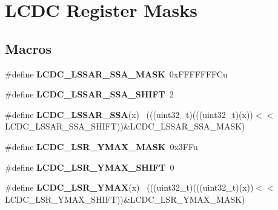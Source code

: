 \hypertarget{group___l_c_d_c___register___masks}{}\section{L\+C\+D\+C Register Masks}
\label{group___l_c_d_c___register___masks}
\subsection*{Macros}
\begin{DoxyCompactItemize}
\item 
\hypertarget{group___l_c_d_c___register___masks_ga2bc109f6b41c11d1b0abfa8b487698ef}{}\#define {\bfseries L\+C\+D\+C\+\_\+\+L\+S\+S\+A\+R\+\_\+\+S\+S\+A\+\_\+\+M\+A\+S\+K}~0x\+F\+F\+F\+F\+F\+F\+F\+Cu\label{group___l_c_d_c___register___masks_ga2bc109f6b41c11d1b0abfa8b487698ef}

\item 
\hypertarget{group___l_c_d_c___register___masks_gad13163c04bf9e7420934dd08e0f37ae0}{}\#define {\bfseries L\+C\+D\+C\+\_\+\+L\+S\+S\+A\+R\+\_\+\+S\+S\+A\+\_\+\+S\+H\+I\+F\+T}~2\label{group___l_c_d_c___register___masks_gad13163c04bf9e7420934dd08e0f37ae0}

\item 
\hypertarget{group___l_c_d_c___register___masks_gaf19ad0434e636ba362fe9377cf2ef88d}{}\#define {\bfseries L\+C\+D\+C\+\_\+\+L\+S\+S\+A\+R\+\_\+\+S\+S\+A}(x)                                            ~(((uint32\+\_\+t)(((uint32\+\_\+t)(x))$<$$<$L\+C\+D\+C\+\_\+\+L\+S\+S\+A\+R\+\_\+\+S\+S\+A\+\_\+\+S\+H\+I\+F\+T))\&L\+C\+D\+C\+\_\+\+L\+S\+S\+A\+R\+\_\+\+S\+S\+A\+\_\+\+M\+A\+S\+K)\label{group___l_c_d_c___register___masks_gaf19ad0434e636ba362fe9377cf2ef88d}

\item 
\hypertarget{group___l_c_d_c___register___masks_ga4ae2fd9ab849237983b3aa226576cfac}{}\#define {\bfseries L\+C\+D\+C\+\_\+\+L\+S\+R\+\_\+\+Y\+M\+A\+X\+\_\+\+M\+A\+S\+K}~0x3\+F\+Fu\label{group___l_c_d_c___register___masks_ga4ae2fd9ab849237983b3aa226576cfac}

\item 
\hypertarget{group___l_c_d_c___register___masks_ga25b78dbb133c75414d19304f7f549ac3}{}\#define {\bfseries L\+C\+D\+C\+\_\+\+L\+S\+R\+\_\+\+Y\+M\+A\+X\+\_\+\+S\+H\+I\+F\+T}~0\label{group___l_c_d_c___register___masks_ga25b78dbb133c75414d19304f7f549ac3}

\item 
\hypertarget{group___l_c_d_c___register___masks_gaf21cfefcf576b4491de721a015aadf63}{}\#define {\bfseries L\+C\+D\+C\+\_\+\+L\+S\+R\+\_\+\+Y\+M\+A\+X}(x)                                              ~(((uint32\+\_\+t)(((uint32\+\_\+t)(x))$<$$<$L\+C\+D\+C\+\_\+\+L\+S\+R\+\_\+\+Y\+M\+A\+X\+\_\+\+S\+H\+I\+F\+T))\&L\+C\+D\+C\+\_\+\+L\+S\+R\+\_\+\+Y\+M\+A\+X\+\_\+\+M\+A\+S\+K)\label{group___l_c_d_c___register___masks_gaf21cfefcf576b4491de721a015aadf63}


\end{DoxyCompactItemize}
